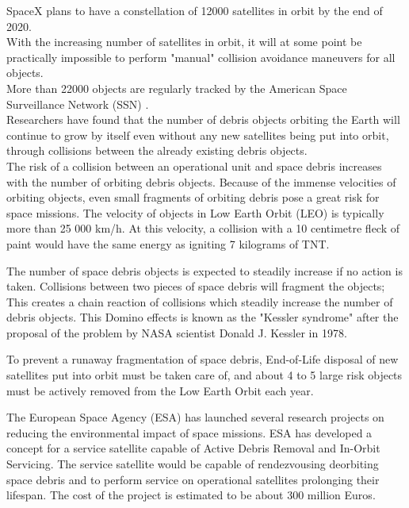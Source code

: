 SpaceX plans to have a constellation of 12000 satellites in orbit by the end of 2020\cite{ESA_constellation}. \\


With the increasing number of satellites in orbit, it will at some point be practically impossible to perform "manual" collision avoidance maneuvers for all objects. \\


More than 22000 objects are regularly tracked by the American Space Surveillance Network (SSN) \cite{ESA_space_debris_figures}. \\


Researchers have found that the number of debris objects orbiting the Earth will continue to grow by itself even without any new satellites being put into orbit, through collisions between the already existing debris objects\cite{Science_2006}. \\



The risk of a collision between an operational unit and space debris increases with the number of orbiting debris objects. Because of the immense velocities of orbiting objects, even small fragments of orbiting debris pose a great risk for space missions. The velocity of objects in Low Earth Orbit (LEO) is typically more than 25 000 km/h. At this velocity, a collision with a 10 centimetre fleck of paint would have the same energy as igniting 7 kilograms of TNT\cite{kessler_syndrome_bigthink}.

The number of space debris objects is expected to steadily increase if no action is taken. Collisions between two pieces of space debris will fragment the objects; This creates a chain reaction of collisions which steadily increase the number of debris objects. This Domino effects is known as the "Kessler syndrome" after the proposal of the problem by NASA scientist Donald J. Kessler in 1978\cite{kessler_syndrome}.

To prevent a runaway fragmentation of space debris, End-of-Life disposal of new satellites put into orbit must be taken care of, and about 4 to 5 large risk objects must be actively removed from the Low Earth Orbit each year\cite{ESA_about_space_debris}.



The European Space Agency (ESA) has launched several research projects on reducing the environmental impact of space missions. ESA has developed a concept for a service satellite capable of Active Debris Removal and In-Orbit Servicing. The service satellite would be capable of rendezvousing deorbiting space debris and to perform service on operational satellites prolonging their lifespan. The cost of the project is estimated to be about 300 million Euros\cite{eDeorbit_cost}.


